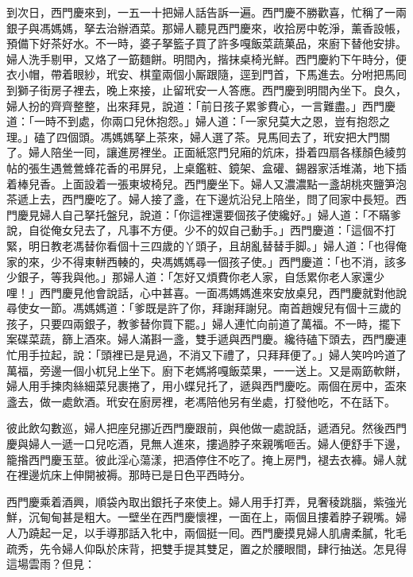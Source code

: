 到次日，西門慶來到，一五一十把婦人話告訴一遍。西門慶不勝歡喜，忙稱了一兩銀子與馮媽媽，拏去治辦酒菜。那婦人聽見西門慶來，收拾房中乾淨，薰香設帳，預備下好茶好水。不一時，婆子拏籃子買了許多嘎飯菜蔬菓品，來廚下替他安排。婦人洗手剔甲，又烙了一筯麵餅。明間內，揩抹桌椅光鮮。西門慶約下午時分，便衣小帽，帶着眼紗，玳安、棋童兩個小厮跟隨，逕到門首，下馬進去。分咐把馬囘到獅子街房子裡去，晚上來接，止留玳安一人答應。西門慶到明間內坐下。良久，婦人扮的齊齊整整，出來拜見，說道：「前日孩子累爹費心，一言難盡。」西門慶道：「一時不到處，你兩口兒休抱怨。」婦人道：「一家兒莫大之恩，豈有抱怨之理。」磕了四個頭。馮媽媽拏上茶來，婦人選了茶。見馬囘去了，玳安把大門關了。{}婦人陪坐一囘，讓進房裡坐。正面紙窓門兒廂的炕床，掛着四扇各樣顏色綾剪帖的張生遇鶯鶯蜂花香的弔屏兒，上桌鑑粧、鏡架、盒礶、錫器家活堆滿，地下插着棒兒香。{}上面設着一張東坡椅兒。{}西門慶坐下。婦人又濃濃點一盞胡桃夾鹽笋泡茶遞上去，西門慶吃了。婦人接了盞，在下邊炕沿兒上陪坐，問了囘家中長短。西門慶見婦人自己拏托盤兒，說道：「你這裡還要個孩子使纔好。」婦人道：「不瞞爹說，自從俺女兒去了，凡事不方便。少不的奴自己動手。」西門慶道：「這個不打緊，明日教老馮替你看個十三四歲的丫頭子，且胡亂替替手脚。」婦人道：「也得俺家的來，少不得東軿西輳的，{}央馮媽媽尋一個孩子使。」西門慶道：「也不消，該多少銀子，等我與他。」那婦人道：「怎好又煩費你老人家，自恁累你老人家還少哩！」西門慶見他會說話，心中甚喜。一面馮媽媽進來安放桌兒，西門慶就對他說尋使女一節。馮媽媽道：「爹既是許了你，拜謝拜謝兒。南首趙嫂兒有個十三歲的孩子，只要四兩銀子，教爹替你買下罷。」婦人連忙向前道了萬福。不一時，擺下案碟菜蔬，篩上酒來。婦人滿斟一盞，雙手遞與西門慶。纔待磕下頭去，西門慶連忙用手拉起，說：「頭裡已是見過，不消又下禮了，只拜拜便了。」婦人笑吟吟道了萬福，旁邊一個小杌兒上坐下。廚下老媽將嘎飯菜果，一一送上。又是兩筯軟餅，婦人用手揀肉絲細菜兒裹捲了，用小蝶兒托了，遞與西門慶吃。兩個在房中，盃來盞去，做一處飲酒。玳安在廚房裡，老馮陪他另有坐處，打發他吃，不在話下。

彼此飲勾數巡，婦人把座兒挪近西門慶跟前，{}與他做一處說話，遞酒兒。然後西門慶與婦人一遞一口兒吃酒，見無人進來，摟過脖子來親嘴咂舌。婦人便舒手下邊，籠揝西門慶玉莖。彼此淫心蕩漾，把酒停住不吃了。掩上房門，褪去衣褲。婦人就在裡邊炕床上伸開被褥。那時已是日色平西時分。

西門慶乘着酒興，順袋內取出銀托子來使上。婦人用手打弄，見奢稜跳腦，紫強光鮮，沉甸甸甚是粗大。一壁坐在西門慶懷裡，一面在上，兩個且摟着脖子親嘴。婦人乃蹺起一足，以手導那話入牝中，兩個挺一囘。西門慶摸見婦人肌膚柔膩，牝毛疏秀，先令婦人仰臥於床背，把雙手提其雙足，置之於腰眼間，肆行抽送。怎見得這場雲雨？但見：


